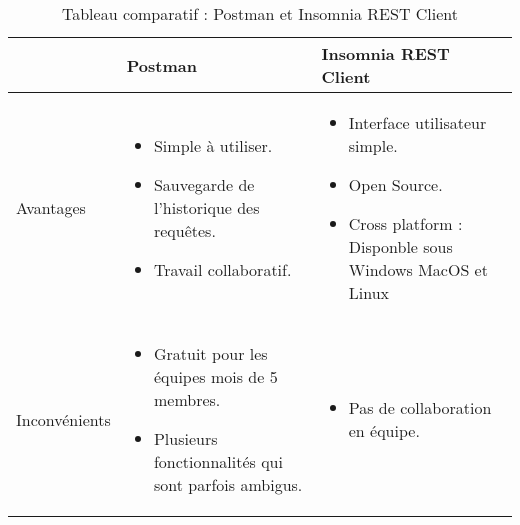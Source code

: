 \begin{table}[H]
    \begin{center}
        \begin{tabularx}{\textwidth} {
                | >{\centering\arraybackslash}X
                | >{\centering\arraybackslash}X
                | >{\centering\arraybackslash}X |}
            \hline
                          & Postman                                                   & Insomnia REST Client       \\
            \hline
            Avantages     & \begin{itemize}
                                \item Simple à utiliser.
                                \item Sauvegarde de l'historique des requêtes.
                                \item Travail collaboratif.
                            \end{itemize}            & \begin{itemize}
                                                           \item Interface utilisateur simple.
                                                           \item Open Source.
                                                           \item Cross platform : Disponble sous Windows MacOS et Linux
                                                       \end{itemize} \\
            \hline
            Inconvénients & \begin{itemize}
                                \item Gratuit pour les équipes mois de 5 membres.
                                \item Plusieurs fonctionnalités qui sont parfois ambigus.
                            \end{itemize} & \begin{itemize}
                                                \item Pas de collaboration en équipe.
                                            \end{itemize}                               \\
            \hline
        \end{tabularx}
        \captionsetup{justification = centering}
        \caption{Tableau comparatif : Postman et Insomnia REST Client}
        \label{compare_postman_insomnia}
    \end{center}
\end{table}
